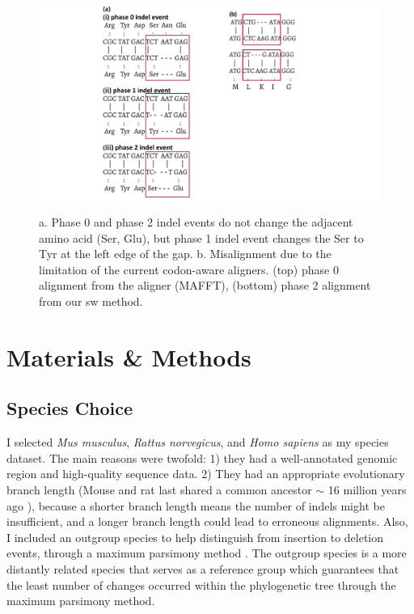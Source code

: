 \begin{figure}[H]
     \centering
     \begin{minipage}[t]{1\textwidth }
     \includegraphics[width=\linewidth]{Fig1.pdf}
     { {a. Phase 0 and phase 2 indel events do not change the adjacent amino acid (Ser, Glu), but phase 1 indel event changes the Ser to Tyr at the left edge of the gap. b. Misalignment due to the limitation of the current codon-aware aligners. (top) phase 0 alignment from the aligner (MAFFT), (bottom) phase 2 alignment from our sw method.}
 \par}
     \end{minipage}
\end{figure}

\section{Materials \& Methods}
\subsection{Species Choice}
I selected \emph{Mus musculus}, \emph{Rattus norvegicus}, and \emph{Homo sapiens} as my species dataset. The main reasons were twofold: 1) they had a well-annotated genomic region and high-quality sequence data. 2) They had an appropriate evolutionary branch length (Mouse and rat last shared a common ancestor $\sim$ 16 million years ago \parencite{springer2003placental}), because a shorter branch length means the number of indels might be insufficient, and a longer branch length could lead to erroneous alignments. Also, I included an outgroup species to help distinguish from insertion to deletion events, through a maximum parsimony method \parencite{saitou1989relative}. The outgroup species is a more distantly related species that serves as a reference group which guarantees that the least number of changes occurred within the phylogenetic tree through the maximum parsimony method.  

